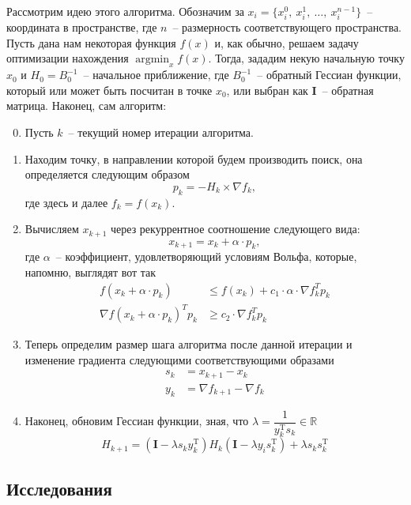 \documentclass[12pt, a4paper, oneside, final]{article}
\begin{document}
	Рассмотрим идею этого алгоритма.
	Обозначим за $x_{i} = \{x_{i}^{0}, ~ x_{i}^{1}, ~ \ldots, ~ x_{i}^{n - 1}\}$~-- координата в пространстве, где $n$~-- размерность соответствующего пространства.
	Пусть дана нам некоторая функция $f(x)$ и, как обычно, решаем задачу оптимизации нахождения $\operatorname*{argmin}_{x}{f(x)}$.
	Тогда, зададим некую начальную точку $x_{0}$ и $H_{0} = B_{0}^{-1}$~-- начальное приближение, где $B_{0}^{-1}$~-- обратный Гессиан функции, который или может быть посчитан в точке $x_{0}$, или выбран как $\mathbf{I}$~-- обратная матрица.
	Наконец, сам алгоритм:
	\begin{enumerate}[1)]
		\setcounter{enumi}{-1}
		\item Пусть $k$~-- текущий номер итерации алгоритма.
		\item Находим точку, в направлении которой будем производить поиск, она определяется следующим образом
		\[
			p_{k} = -H_{k} \times \nabla{f_{k}},
		\] где здесь и далее $f_{k} = f(x_{k})$.
		\item Вычисляем $x_{k + 1}$ через рекуррентное соотношение следующего вида:
		\[
			x_{k + 1} = x_{k} + \alpha \cdot p_{k},
		\] где $\alpha$~-- коэффициент, удовлетворяющий условиям Вольфа, которые, напомню, выглядят вот так
		\begin{align*}
			f(x_{k} + \alpha \cdot p_{k}) &\leqslant f(x_{k}) + c_{1} \cdot \alpha \cdot \nabla{f^{T}_{k}p_{k}} \\
			\nabla{f(x_{k} + \alpha \cdot p_{k})^{T}p_{k}} &\geqslant c_{2} \cdot \nabla{f^{T}_{k}p_{k}}
		\end{align*}
		\item Теперь определим размер шага алгоритма после данной итерации и изменение градиента следующими соответствующими образами
		\begin{align*}
			s_{k} &= x_{k + 1} - x_{k} \\
			y_{k} &= \nabla{f_{k + 1}} - \nabla{f_{k}}
		\end{align*}
		\item Наконец, обновим Гессиан функции, зная, что $\lambda = \dfrac{1}{y_{k}^{\mathrm{T}}s_{k}} \in \mathbb{R}$
		\[
			H_{k + 1} = \left(\mathbf{I} - \lambda s_{k}y_{k}^{\mathrm{T}}\right)H_{k}\left(\mathbf{I} - \lambda y_{i} s_{k}^{\mathrm{T}}\right) + \lambda s_{k} s_{k}^{\mathrm{T}}
		\]
	\end{enumerate}
	\subsection*{Исследования}
	\newpage
\end{document}
